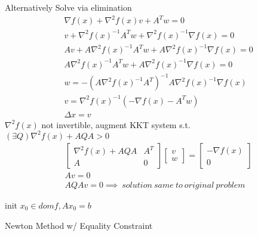 \documentclass[8pt]{extarticle}
\begin{document}
\begin{multicols*}{2}
  Alternatively Solve via elimination
  \begin{align*}
    &\nabla f(x) + \nabla^2 f(x) v + A^T w = 0\\
    &v + \nabla^2 f(x)^{-1} A^T w + \nabla^2 f(x)^{-1} \nabla f(x)=0\\
    &Av + A \nabla^2 f(x)^{-1} A^T w + A \nabla^2 f(x)^{-1} \nabla f(x)=0\\
    &A \nabla^2 f(x)^{-1} A^T w + A \nabla^2 f(x)^{-1} \nabla f(x)=0\\
    &w = - (A \nabla^2 f(x)^{-1} A^T)^{-1} A \nabla^2 f(x)^{-1} \nabla f(x)\\
    &v = \nabla^2 f(x)^{-1} (-\nabla f(x) - A^T w)\\
    &\Delta x = v
  \end{align*}
  $\nabla^2 f(x)$ not invertible, augment KKT system s.t.\\
  $(\exists Q) \nabla^2 f(x) + AQA > 0$
  \begin{align*}
    &\begin{bmatrix}
      \nabla^2 f(x) + AQA & A^T \\
      A & 0 
    \end{bmatrix}
    \begin{bmatrix}
      v\\ w
    \end{bmatrix} =
    \begin{bmatrix}
      -\nabla f(x)\\
      0
    \end{bmatrix}\\
    &Av=0\\
    &AQAv = 0 \implies\ solution\ same\ to\ original\ problem
  \end{align*}
  
  \vfill\null
  \columnbreak
  
  \begin{algorithm}[H]
    init $x_0 \in dom f, Ax_0=b$\;
    \caption{Newton Method w/ Equality Constraint\label{NewtonMethodEq}}
  \end{algorithm}


\end{multicols*}
\end{document}
